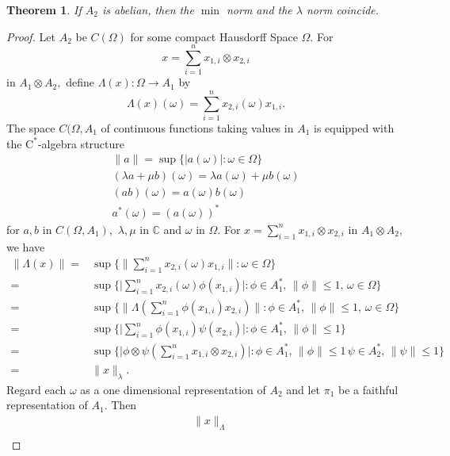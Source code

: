 \documentclass{article}
\theoremstyle{plain}
\newtheorem{theorem}{Theorem}[section]
\theoremstyle{definition}
\theoremstyle{remark}
\begin{document}
\begin{theorem}
    If $A_2$ is abelian, then the $\min$ norm and the $\lambda$ norm coincide.
\end{theorem}
\begin{proof}
	Let $A_2$ be $C(\Omega)$ for some compact Hausdorff Space $\Omega.$
	For
	\[
		x = \sum_{i=1}^{n} x_{1,i} \otimes x_{2,i}
	\]
	in $A_1 \otimes A_2,$
	define
	$\Lambda  (x) \colon \Omega \to A_1$
	by
	\[
		\Lambda (x) (\omega) = \sum_{i=1}^{n} x_{2,i}(\omega) x_{1,i}.
	\]
	The space $C(\Omega, A_1$ of continuous functions taking values in $A_1$ 
	is equipped with the $\text{C}^\ast$\nobreakdash-algebra structure
\begin{gather*}
	\lVert a \rVert = \sup\{ \lvert a(\omega) \rvert \colon 
	\omega \in \Omega \} \\
	(\lambda a + \mu b)(\omega) = \lambda a(\omega) + \mu b(\omega) \\
	(ab) (\omega) = a(\omega) b(\omega) \\
	a^\ast (\omega) = (a(\omega))^\ast
\end{gather*}
for $a,b$ in $C(\Omega, A_1),$ $\lambda, \mu$ in $\mathbb{C}$
and $\omega$ in $\Omega.$
For $x = \sum_{i=1}^{n} x_{1,i} \otimes x_{2,i}$ in $A_1 \otimes A_2,$
we have
\begin{align*}
	\lVert \Lambda (x) \rVert
	={}& \sup \{ \lVert \sum_{i=1}^{n} x_{2,i}(\omega) x_{1,i} \rVert
	\colon \omega \in \Omega \} \\
	={}& \sup \{ \lvert \sum_{i=1}^{n} x_{2,i}(\omega) \phi(x_{1,i}) \rvert
	\colon \phi \in A_1^\ast, \, \lVert \phi \rVert \leq 1, \, \omega \in \Omega \} \\
	={}& \sup \{ \lVert \Lambda( \sum_{i=1}^{n} \phi(x_{1,i}) x_{2,i})  \rVert
	\colon \phi \in A_1^\ast, \, \lVert \phi \rVert \leq 1, \, \omega \in \Omega \} \\
	={}& \sup \{ \lvert  \sum_{i=1}^{n} \phi(x_{1,i}) \psi( x_{2,i})  \rvert
	\colon \phi \in A_1^\ast, \, \lVert \phi \rVert \leq 1 \} \\
	={}& \sup \{ \lvert   \phi \otimes \psi ( \sum_{i=1}^{n} x_{1,i} \otimes x_{2,i})  \rvert
	\colon \phi \in A_1^\ast, \, \lVert \phi \rVert \leq 1 \,
\psi \in A_2^\ast, \, \lVert \psi \rVert \leq 1 \} \\
	={}& \lVert x \rVert_{\lambda} .
\end{align*}
Regard each $\omega$ as a one dimensional representation of $A_2$
and let $\pi_1$ be a faithful representation of $A_1.$
Then
\begin{align*}
	{}& \lVert x \rVert_\Lambda \\

\end{align*}
\end{proof}
\end{document}

